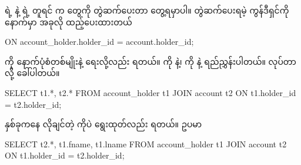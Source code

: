 \begin{figure}[H]
\caption{} 
\label{fig:join}
\end{figure}
  ရဲ့  နဲ့    ရဲ့  တူရင်  က  တွေကို တွဲဆက်ပေးတာ တွေ့ရမှာပါ။ တွဲဆက်ပေးရမဲ့ ကွန်ဒီရှင်ကို  နောက်မှာ အခုလို ထည့်ပေးထားတယ်
%
\begin{sql}
ON account_holder.holder_id = account.holder_id;
\end{sql}
%
 ကို နောက်ပုံစံတစ်မျိုးနဲ့ ရေးလို့လည်း ရတယ်။   ကို  နဲ့၊  ကို  နဲ့ ရည်ညွှန်းပါတယ်။  လုပ်တာလို့ ခေါ်ပါတယ်။
%
\begin{sql}
SELECT 
    t1.*,
    t2.* 
FROM account_holder t1 JOIN account t2
    ON t1.holder_id = t2.holder_id;
\end{sql}
%
 နှစ်ခုကနေ လိုချင်တဲ့  ကိုပဲ ရွေးထုတ်လည်း ရတယ်။ ဥပမာ
%
\begin{sql}
SELECT 
    t2.*,
    t1.fname,
    t1.lname
FROM account_holder t1 JOIN account t2
    ON t1.holder_id = t2.holder_id;
\end{sql}
%

